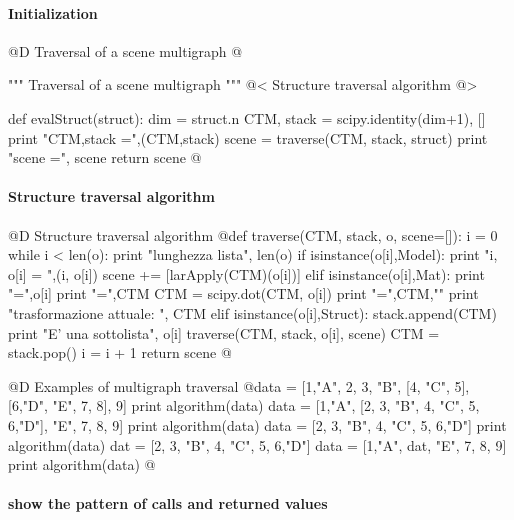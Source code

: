 \documentclass[11pt,oneside]{article}	%
\begin{document}
\paragraph{Initialization}

@D Traversal of a scene multigraph
@{""" Traversal of a scene multigraph """
@< Structure traversal algorithm @>

def evalStruct(struct):
    dim = struct.n
    CTM, stack = scipy.identity(dim+1), []
    print "\n CTM,stack =",(CTM,stack)
    scene = traverse(CTM, stack, struct) 
    print "\n scene =", scene
    return scene
@}

\paragraph{Structure traversal algorithm}

@D Structure traversal algorithm 
@{def traverse(CTM, stack, o, scene=[]):
    i = 0
    while i < len(o):
        print "lunghezza lista", len(o)
        if isinstance(o[i],Model): 
            print "i, o[i] = ",(i, o[i])
            scene += [larApply(CTM)(o[i])]
        elif isinstance(o[i],Mat): 
            print "\no[i] =\n",o[i]
            print "\nCTM =\n",CTM
            CTM = scipy.dot(CTM, o[i])
            print "\nCTM =\n",CTM,"\n"
            print "trasformazione attuale: \n", CTM
        elif isinstance(o[i],Struct):
            stack.append(CTM) 
            print "E' una sottolista", o[i]
            traverse(CTM, stack, o[i], scene)
            CTM = stack.pop()
        i = i + 1
    return scene
@}
  
@D Examples of multigraph traversal
@{data = [1,"A", 2, 3, "B", [4, "C", 5], [6,"D", "E", 7, 8], 9]  
print algorithm(data)
data = [1,"A", [2, 3, "B", 4, "C", 5, 6,"D"], "E", 7, 8, 9]  
print algorithm(data)
data = [2, 3, "B", 4, "C", 5, 6,"D"]
print algorithm(data)
dat = [2, 3, "B", 4, "C", 5, 6,"D"]
data = [1,"A", dat, "E", 7, 8, 9]
print algorithm(data)
@}


\paragraph{show the pattern of calls and returned values}
\end{document}
